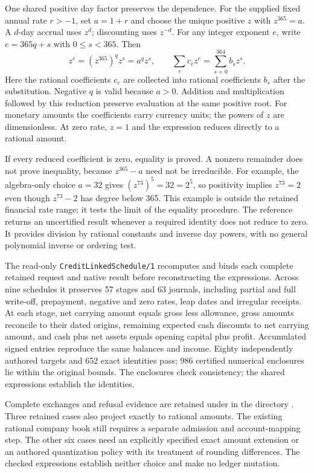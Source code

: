 One shared positive day factor preserves the dependence. For the supplied
fixed annual rate $r>-1$, set $a=1+r$ and choose the unique positive $z$ with
$z^{365}=a$. A $d$-day accrual uses $z^d$; discounting uses $z^{-d}$. For any
integer exponent $e$, write $e=365q+s$ with $0\leq s<365$. Then
\[
 z^e=(z^{365})^qz^s=a^qz^s,
 \qquad
 \sum_e c_ez^e=\sum_{s=0}^{364}b_sz^s .
\]
Here the rational coefficients $c_e$ are collected into rational coefficients
$b_s$ after the substitution. Negative $q$ is valid because $a>0$. Addition
and multiplication followed by this reduction preserve evaluation at the
same positive root. For monetary amounts the coefficients carry currency
units; the powers of $z$ are dimensionless. At zero rate, $z=1$ and the
expression reduces directly to a rational amount.

If every reduced coefficient is zero, equality is proved. A nonzero remainder
does not prove inequality, because $z^{365}-a$ need not be irreducible. For
example, the algebra-only choice $a=32$ gives $(z^{73})^5=32=2^5$, so positivity
implies $z^{73}=2$ even though $z^{73}-2$ has degree below 365. This example is
outside the retained financial rate range; it tests the limit of the equality
procedure. The reference returns an uncertified result whenever a required
identity does not reduce to zero. It provides division by rational constants
and inverse day powers, with no general polynomial inverse or ordering test.

The read-only \texttt{CreditLinkedSchedule/1} recomputes and binds each complete
retained request and native result before reconstructing the expressions.
Across nine schedules it preserves 57 stages and 63 journals, including
partial and full write-off, prepayment, negative and zero rates, leap dates
and irregular receipts. At each stage, net carrying amount equals gross less
allowance, gross amounts reconcile to their dated origins, remaining expected
cash discounts to net carrying amount, and cash plus net assets equals opening
capital plus profit. Accumulated signed entries reproduce the same balances
and income. Eighty independently authored targets and 652 exact identities
pass; 986 certified numerical enclosures lie within the original bounds. The
enclosures check consistency; the shared expressions establish the identities.

Complete exchanges and refusal evidence are retained under
{\small{}} in the directory
{\small{}}. Three
retained cases also project exactly to rational amounts. The existing rational
company book still requires a separate admission and account-mapping step.
The other six cases need an explicitly specified exact amount extension or
an authored quantization policy with its treatment of rounding differences.
The checked expressions establish neither choice and make no ledger mutation.


